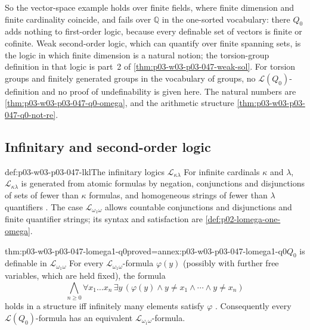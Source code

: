 So the vector-space example holds over finite fields, where finite
dimension and finite cardinality coincide, and fails over \(\mathbb Q\) in
the one-sorted vocabulary: there \(Q_0\) adds nothing to first-order logic,
because every definable set of vectors is finite or cofinite.  Weak
second-order logic, which can quantify over finite spanning sets, is the
logic in which finite dimension is a natural notion; the torsion-group
definition in that logic is part~2 of \cref{thm:p03-w03-p03-047-weak-sol}.
For torsion groups and finitely generated groups in the vocabulary of
groups, no \(\mathscr L(Q_0)\)-definition and no proof of undefinability is
given here.  The natural numbers are \cref{thm:p03-w03-p03-047-q0-omega},
and the arithmetic structure \cref{thm:p03-w03-p03-047-q0-not-re}.

\subsection{Infinitary and second-order logic}

\begin{hbdefinition}{def:p03-w03-p03-047-lkl}{The infinitary logics \(\mathscr L_{\kappa\lambda}\)}
For infinite cardinals \(\kappa\) and \(\lambda\), \(\mathscr L_{\kappa\lambda}\)
is generated from atomic formulas by negation, conjunctions and disjunctions
of sets of fewer than \(\kappa\) formulas, and homogeneous strings of fewer
than \(\lambda\) quantifiers \cite[Ch.~I, \S1.6, p.~10]{Barwise1985BackgroundAims}.
The case \(\mathscr L_{\omega_1\omega}\) allows countable conjunctions and
disjunctions and finite quantifier strings; its syntax and satisfaction are
\cref{def:p02-lomega-one-omega}.
\end{hbdefinition}

\begin{hbtheorem}{thm:p03-w03-p03-047-lomega1-q0}{proved=annex:p03-w03-p03-047-lomega1-q0}{\(Q_0\) is definable in \(\mathscr L_{\omega_1\omega}\)}
For every \(\mathscr L_{\omega_1\omega}\)-formula \(\varphi(y)\) (possibly
with further free variables, which are held fixed), the formula
\[
 \bigwedge_{n\ge 0}\forall x_1\ldots x_n\,\exists y\,
 (\varphi(y)\land y\ne x_1\land\cdots\land y\ne x_n)
\]
holds in a structure iff infinitely many elements satisfy \(\varphi\)
\cite[Ch.~I, \S1.6, pp.~10--11]{Barwise1985BackgroundAims}.  Consequently every
\(\mathscr L(Q_0)\)-formula has an equivalent \(\mathscr L_{\omega_1\omega}\)-formula.
\end{hbtheorem}

